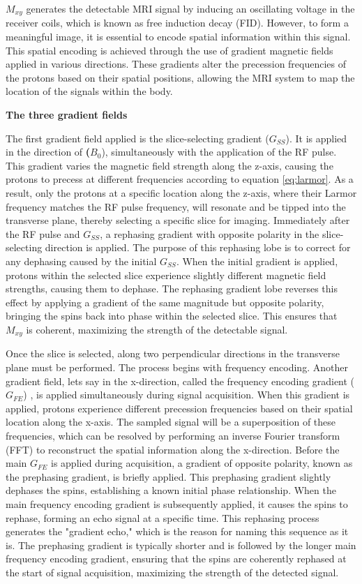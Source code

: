 \documentclass{micro-econ-thesis}
\begin{document}
\textbf{$M_{xy}$} generates the detectable MRI signal by inducing an oscillating voltage in the receiver coils, which is known as free induction decay (FID). However, to form a meaningful image, it is essential to encode spatial information within this signal. This spatial encoding is achieved through the use of gradient magnetic fields applied in various directions. These gradients alter the precession frequencies of the protons based on their spatial positions, allowing the MRI system to map the location of the signals within the body.  

\textbf{The three gradient fields}

The first gradient field applied is the slice-selecting gradient ($G_{SS}$). It is applied in the direction of \textbf{($B_0$}), simultaneously with the application of the RF pulse. 
This gradient varies the magnetic field strength along the z-axis, causing the protons to precess at different frequencies according to equation \ref{eq:larmor}. As a result, only the protons at a specific location along the z-axis, where their Larmor frequency matches the RF pulse frequency, will resonate and be tipped into the transverse plane, thereby selecting a specific slice for imaging. Immediately after the RF pulse and $G_{SS}$, a rephasing gradient with opposite polarity in the slice-selecting direction is applied. The purpose of this rephasing lobe is to correct for any dephasing caused by the initial  $G_{SS}$. When the initial gradient is applied, protons within the selected slice experience slightly different magnetic field strengths, causing them to dephase. The rephasing gradient lobe reverses this effect by applying a gradient of the same magnitude but opposite polarity, bringing the spins back into phase within the selected slice. This ensures that \textbf{$M_{xy}$} is coherent, maximizing the strength of the detectable signal.

Once the slice is selected, along two perpendicular directions in the transverse plane must be performed. The process begins with frequency encoding. Another gradient field, lets say in the x-direction, called the frequency encoding gradient (\textbf{$G_{FE}$}) , is applied simultaneously during signal acquisition. When this gradient is applied, protons experience different precession frequencies based on their spatial location along the x-axis. The sampled signal will be a superposition of these frequencies, which can be resolved by performing an inverse Fourier transform (FFT) to reconstruct the spatial information along the x-direction. Before the main \textbf{$G_{FE}$} is applied during acquisition, a gradient of opposite polarity, known as the prephasing gradient, is briefly applied. This prephasing gradient slightly dephases the spins, establishing a known initial phase relationship. When the main frequency encoding gradient is subsequently applied, it causes the spins to rephase, forming an echo signal at a specific time. This rephasing process generates the "gradient echo," which is the reason for naming this sequence as it is. The prephasing gradient is typically shorter and is followed by the longer main frequency encoding gradient, ensuring that the spins are coherently rephased at the start of signal acquisition, maximizing the strength of the detected signal.
\end{document}
